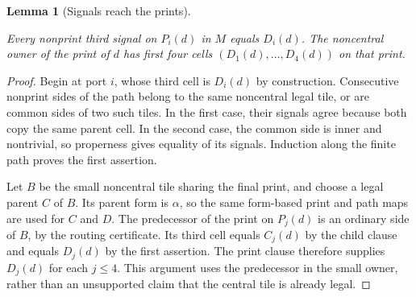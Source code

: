 \documentclass[11pt,a4paper]{article}
\newtheorem{lemma}[definition]{Lemma}
\theoremstyle{remark}
\newcommand{\lean}[1]{}
\newcommand{\uses}[1]{}
\begin{document}
\begin{lemma}[Signals reach the prints]
\label{lem:comp/signals}
\lean{Tilings.Planned.path_and_print_recovery,Tilings.Planned.Strict.strict_path_and_print_recovery}
\uses{def:certificate,lem:comp/legal-properties,lem:comp/reconstruction}
Every nonprint third signal on $P_i(d)$ in $M$ equals $D_i(d)$.
The noncentral owner of the print of $d$ has first four cells
$(D_1(d),\ldots,D_4(d))$ on that print.
\end{lemma}
\begin{proof}
Begin at port $i$, whose third cell is $D_i(d)$ by construction.
Consecutive nonprint sides of the path belong to the same noncentral legal
tile, or are common sides of two such tiles. In the first case, their
signals agree because both copy the same parent cell. In the second case,
the common side is inner and nontrivial, so properness gives equality of
its signals. Induction along the finite path proves the first assertion.

Let $B$ be the small noncentral tile sharing the final print, and choose a
legal parent $C$ of $B$. Its parent form is $\alpha$, so the same form-based
print and path maps are used for $C$ and $D$. The predecessor of the print
on $P_j(d)$ is an ordinary side of $B$, by the routing certificate. Its
third cell equals $C_j(d)$ by the child clause and equals $D_j(d)$ by the
first assertion. The print clause therefore supplies $D_j(d)$ for each
$j\le4$. This argument uses the predecessor in the small owner, rather
than an unsupported claim that the central tile is already legal.
\end{proof}
\end{document}
